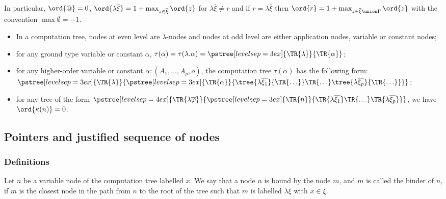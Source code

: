 In particular, $\ord{@} = 0$, $\ord{\lambda \overline{\xi}} = 1+
\max_{z\in \overline{\xi}} \ord{z}$ for $\lambda \overline{\xi}\neq
r$ and if $r=\lambda \overline{\xi}$ then $\ord{r} = 1 + \max_{z\in
\overline{\xi}\union \Gamma} \ord{z}$ with the convention $\max
\emptyset = -1$.

\begin{remark} \hfill
\begin{itemize}
\item In a computation tree, nodes at even level are $\lambda$-nodes and nodes at odd level are either application nodes,
variable or constant nodes;

\item for any ground type variable or constant $\alpha$,
$\tau(\alpha) = \tau(\lambda . \alpha) =  \pstree[levelsep=3ex]
    { \TR{\lambda } }
    { \TR{\alpha}
    }$;

\item for any higher-order variable or constant $\alpha : (A_1,\ldots,A_p,o)$, the computation tree $\tau(\alpha)$ has the following form:
$ \pstree[levelsep=3ex]{\TR{\lambda}}
        {\pstree[levelsep=3ex]
                { \TR{\alpha} }
                { \tree{\lambda \overline{\xi_1}}{\TR{\ldots}} \TR{\ldots} \tree{\lambda \overline{\xi_p}}{\TR{\ldots}}
                }
        }
$;

\item for any tree of the form
        $ \pstree[levelsep=4ex]
            { \TR{\lambda \overline{\varphi}} }
            { \pstree[levelsep=3ex]
                {\TR{n}}
                {\TR{\lambda \overline{\xi_1}} \TR{\ldots} \TR{\lambda \overline{\xi_p}}}
            }
        $,
    we have $\ord{\kappa(n)}=0$.

\end{itemize}
\end{remark}


\subsection{Pointers and justified sequence of nodes}
\subsubsection{Definitions}
\begin{definition}[Binder]
Let $n$ be a variable node of the computation tree labelled $x$. We
say that a node $n$ is bound by the node $m$, and $m$ is called the
binder of $n$, if $m$ is the closest node in the path from $n$ to
the root of the tree such that $m$ is labelled $\lambda
\overline{\xi}$ with $x\in \overline{\xi}$.
\end{definition}

